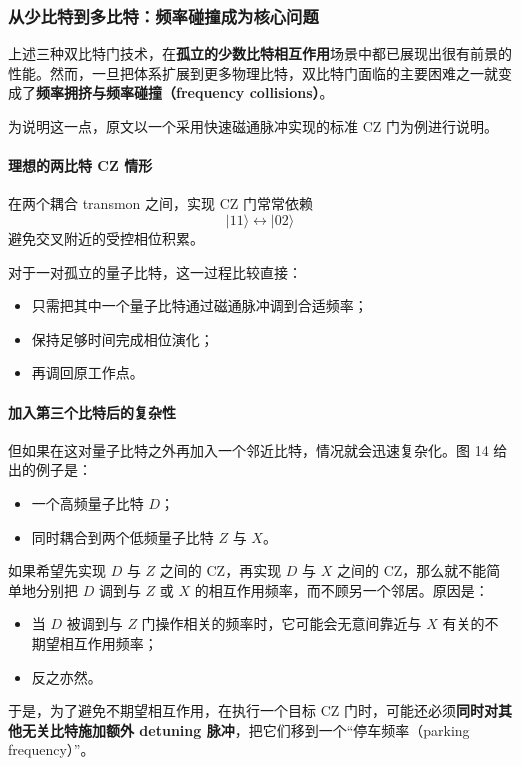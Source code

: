 \documentclass[12pt,a4paper,oneside]{ctexbook}
\begin{document}
\subsubsection{从少比特到多比特：频率碰撞成为核心问题}

上述三种双比特门技术，在\textbf{孤立的少数比特相互作用}场景中都已展现出很有前景的性能。然而，一旦把体系扩展到更多物理比特，双比特门面临的主要困难之一就变成了\textbf{频率拥挤与频率碰撞（frequency collisions）}。

为说明这一点，原文以一个采用快速磁通脉冲实现的标准 CZ 门为例进行说明。

\paragraph{理想的两比特 CZ 情形}
在两个耦合 transmon 之间，实现 CZ 门常常依赖
\[
|11\rangle \leftrightarrow |02\rangle
\]
避免交叉附近的受控相位积累。

对于一对孤立的量子比特，这一过程比较直接：
\begin{itemize}
    \item 只需把其中一个量子比特通过磁通脉冲调到合适频率；
    \item 保持足够时间完成相位演化；
    \item 再调回原工作点。
\end{itemize}

\paragraph{加入第三个比特后的复杂性}
但如果在这对量子比特之外再加入一个邻近比特，情况就会迅速复杂化。图 14 给出的例子是：
\begin{itemize}
    \item 一个高频量子比特 \(D\)；
    \item 同时耦合到两个低频量子比特 \(Z\) 与 \(X\)。
\end{itemize}

如果希望先实现 \(D\) 与 \(Z\) 之间的 CZ，再实现 \(D\) 与 \(X\) 之间的 CZ，那么就不能简单地分别把 \(D\) 调到与 \(Z\) 或 \(X\) 的相互作用频率，而不顾另一个邻居。原因是：

\begin{itemize}
    \item 当 \(D\) 被调到与 \(Z\) 门操作相关的频率时，它可能会无意间靠近与 \(X\) 有关的不期望相互作用频率；
    \item 反之亦然。
\end{itemize}

于是，为了避免不期望相互作用，在执行一个目标 CZ 门时，可能还必须\textbf{同时对其他无关比特施加额外 detuning 脉冲}，把它们移到一个“停车频率（parking frequency）”。
\end{document}
